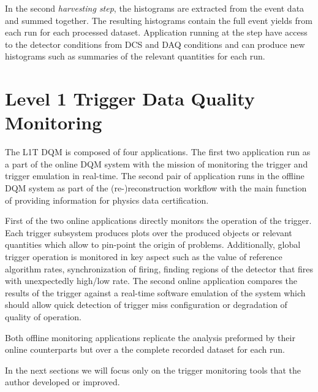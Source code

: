In the second \textit{harvesting step}, the histograms are extracted from the event data and summed together. The resulting histograms contain the full event yields from each run for each processed dataset. Application running at the step have access to the detector conditions from \gls{DCS} and \gls{DAQ} conditions and can produce new histograms such as summaries of the relevant quantities for each run.

\section{Level 1 Trigger Data Quality Monitoring}
\label{SECTION:TechnicalWork_L1TDQM}


The \acrfull{L1T} \acrfull{DQM} is composed of four applications. The first two application run as a part of the online \gls{DQM} system with the mission of monitoring the trigger and trigger emulation in real-time. The second pair of application runs in the offline \gls{DQM} system as part of the (re-)reconstruction workflow with the main function of providing information for physics data certification.

First of the two online applications directly monitors the operation of the trigger. Each trigger subsystem produces plots over the produced objects or relevant quantities which allow to pin-point the origin of problems. Additionally, global trigger operation is monitored in key aspect such as the value of reference algorithm rates, synchronization of firing, finding regions of the detector that fires with unexpectedly high/low rate. The second online application compares the results of the trigger against a real-time software emulation of the system which should allow quick detection of trigger miss configuration or degradation of quality of operation.

Both offline monitoring applications replicate the analysis preformed by their online counterparts but over a the complete recorded dataset for each run.

In the next sections we will focus only on the trigger monitoring tools that the author developed or improved.

